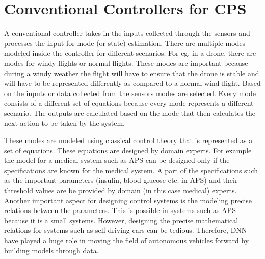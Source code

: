 \section{Conventional Controllers for CPS}

A conventional controller takes in the inputs collected through the sensors and processes the input for mode (or state) estimation. There are multiple modes  modeled inside the controller for different scenarios. For eg. in a drone, there are modes for windy flights or normal flights. These modes are important because during a windy weather the flight will have to ensure that the drone is stable and will have to be represented differently as compared to a normal wind flight. Based on the inputs or data collected from the sensors modes are selected. Every mode consists of a different set of equations because every mode represents a different scenario. The outputs are calculated based on the mode that then calculates the next action to be taken by the system. 

These modes are modeled using classical control theory that is represented as a set of equations. These equations are designed by domain experts. For example the model for a medical system such as \ac{APS} can be designed only if the specifications are known for the medical system. A part of the specifications such as the important parameters (insulin, blood glucose etc. in APS) and their threshold values are be provided by domain (in this case medical) experts. Another important aspect for designing control systems is the  modeling precise relations between the parameters. This is possible in systems such as APS because it is a small systems. However, designing the precise mathematical relations for systems such as self-driving cars can be tedious. Therefore, \ac{DNN} have played a huge role in moving the field of autonomous vehicles forward by building models through data. 

  



